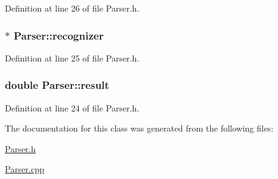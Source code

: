 Definition at line 26 of file Parser.\+h.

\hypertarget{classParser_a095ffde82968c2b8b067752f1b7ff9f5}{}
\subsubsection[{recognizer}]{$\ast$ Parser\+::recognizer\hspace{0.3cm}{\ttfamily [private]}}\label{classParser_a095ffde82968c2b8b067752f1b7ff9f5}


Definition at line 25 of file Parser.\+h.

\hypertarget{classParser_adab1eb7202f5042fa2daa7cd4238799e}{}
\subsubsection[{result}]{\setlength{\rightskip}{0pt plus 5cm}double Parser\+::result\hspace{0.3cm}{\ttfamily [private]}}\label{classParser_adab1eb7202f5042fa2daa7cd4238799e}


Definition at line 24 of file Parser.\+h.



The documentation for this class was generated from the following files\+:\begin{DoxyCompactItemize}
\item 
\hyperlink{Parser_8h}{Parser.\+h}\item 
\hyperlink{Parser_8cpp}{Parser.\+cpp}\end{DoxyCompactItemize}
